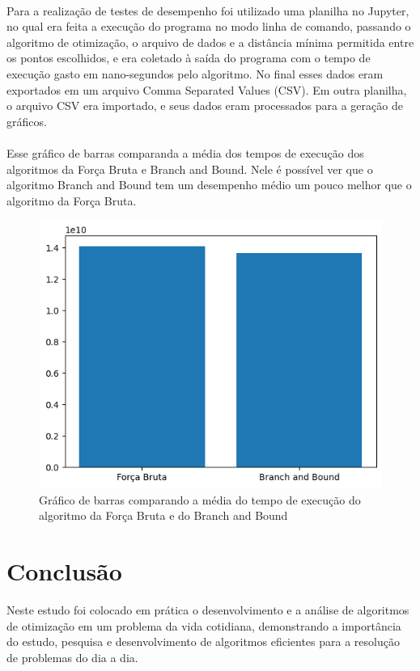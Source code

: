 \documentclass[12pt]{article}
\begin{document}
\paragraph{}Para a realização de testes de desempenho foi utilizado uma planilha no Jupyter, no qual era feita a execução do programa no modo linha de comando, passando o algoritmo de otimização, o arquivo de dados e a distância mínima permitida entre os pontos escolhidos, e era coletado à saída do programa com o tempo de execução gasto em nano-segundos pelo algoritmo. No final esses dados eram exportados em um arquivo Comma Separated Values (CSV). Em outra planilha, o arquivo CSV era importado, e seus dados eram processados para a geração de gráficos.

\paragraph{}Esse gráfico de barras comparanda a média dos tempos de execução dos algoritmos da Força Bruta e Branch and Bound. Nele é possível ver que o algoritmo Branch and Bound tem um desempenho médio um pouco melhor que o algoritmo da Força Bruta.

\begin{figure}
    \centering
    \includegraphics{comparacao.png}
    \caption{Gráfico de barras comparando a média do tempo de execução do algoritmo da Força Bruta e do Branch and Bound}
    \label{fig:fig-9}
\end{figure}

\section{Conclusão}

Neste estudo foi colocado em prática o desenvolvimento e a análise de algoritmos de otimização em um problema da vida cotidiana, demonstrando a importância do estudo, pesquisa e desenvolvimento de algoritmos eficientes para a resolução de problemas do dia a dia.

\nocite{paaII}
\nocite{paaIII}
\nocite{paaIV}



%
\end{document}
